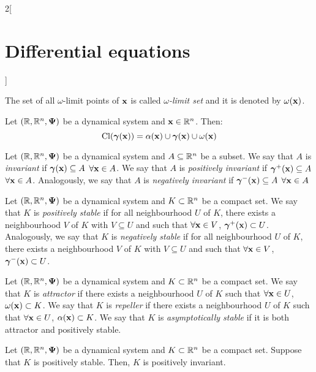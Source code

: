 \documentclass[../../../main.tex]{subfiles}
\begin{document}
\begin{multicols}{2}[\section{Differential equations}]
\begin{definition}
        The set of all $\omega$-limit points of $\boldsymbol{\mathrm{x}}$ is called \textit{$\omega$-limit set} and it is denoted by $\omega(\boldsymbol{\mathrm{x}})$.
    \end{definition}
    \begin{prop}
        Let $(\mathbb{R},\mathbb{R}^n,\boldsymbol{\mathrm{\Psi}})$ be a dynamical system and $\boldsymbol{\mathrm{x}}\in\mathbb{R}^n$. Then: $$\operatorname{Cl}(\boldsymbol{\mathrm{\gamma}}(\boldsymbol{\mathrm{x}}))=\alpha(\boldsymbol{\mathrm{x}})\cup\boldsymbol{\mathrm{\gamma}}(\boldsymbol{\mathrm{x}})\cup\omega(\boldsymbol{\mathrm{x}})$$
    \end{prop}
    \begin{definition}
        Let $(\mathbb{R},\mathbb{R}^n,\boldsymbol{\mathrm{\Psi}})$ be a dynamical system and $A\subseteq \mathbb{R}^n$ be a subset. We say that $A$ is \textit{invariant} if $\boldsymbol{\mathrm{\gamma}}(\boldsymbol{\mathrm{x}})\subseteq A$ $\forall\boldsymbol{\mathrm{x}}\in A$. We say that $A$ is \textit{positively invariant} if $\boldsymbol{\mathrm{\gamma}}^+(\boldsymbol{\mathrm{x}})\subseteq A$ $\forall\boldsymbol{\mathrm{x}}\in A$. Analogously, we say that $A$ is \textit{negatively invariant} if $\boldsymbol{\mathrm{\gamma}}^-(\boldsymbol{\mathrm{x}})\subseteq A$ $\forall\boldsymbol{\mathrm{x}}\in A$
    \end{definition}
    \begin{definition}
        Let $(\mathbb{R},\mathbb{R}^n,\boldsymbol{\mathrm{\Psi}})$ be a dynamical system and $K\subset \mathbb{R}^n$ be a compact set. We say that $K$ is \textit{positively stable} if for all neighbourhood $U$ of $K$, there exists a neighbourhood $V$ of $K$ with $V\subseteq U$ and such that $\forall \boldsymbol{\mathrm{x}}\in V$, $\boldsymbol{\mathrm{\gamma}}^+(\boldsymbol{\mathrm{x}})\subset U$. Analogously, we say that $K$ is \textit{negatively stable} if for all neighbourhood $U$ of $K$, there exists a neighbourhood $V$ of $K$ with $V\subseteq U$ and such that $\forall \boldsymbol{\mathrm{x}}\in V$, $\boldsymbol{\mathrm{\gamma}}^-(\boldsymbol{\mathrm{x}})\subset U$.
    \end{definition}
    \begin{definition}
        Let $(\mathbb{R},\mathbb{R}^n,\boldsymbol{\mathrm{\Psi}})$ be a dynamical system and $K\subset \mathbb{R}^n$ be a compact set. We say that $K$ is \textit{attractor} if there exists a neighbourhood $U$ of $K$ such that $\forall \boldsymbol{\mathrm{x}}\in U$, $\omega(\boldsymbol{\mathrm{x}})\subset K$.  We say that $K$ is \textit{repeller} if there exists a neighbourhood $U$ of $K$ such that $\forall \boldsymbol{\mathrm{x}}\in U$, $\alpha(\boldsymbol{\mathrm{x}})\subset K$. We say that $K$ is \textit{asymptotically stable} if it is both attractor and positively stable.
    \end{definition}
    \begin{prop}
        Let $(\mathbb{R},\mathbb{R}^n,\boldsymbol{\mathrm{\Psi}})$ be a dynamical system and $K\subset \mathbb{R}^n$ be a compact set. Suppose that $K$ is positively stable. Then, $K$ is positively invariant.
    \end{prop}
    \begin{definition}

\end{definition}
\end{multicols}
\end{document}
